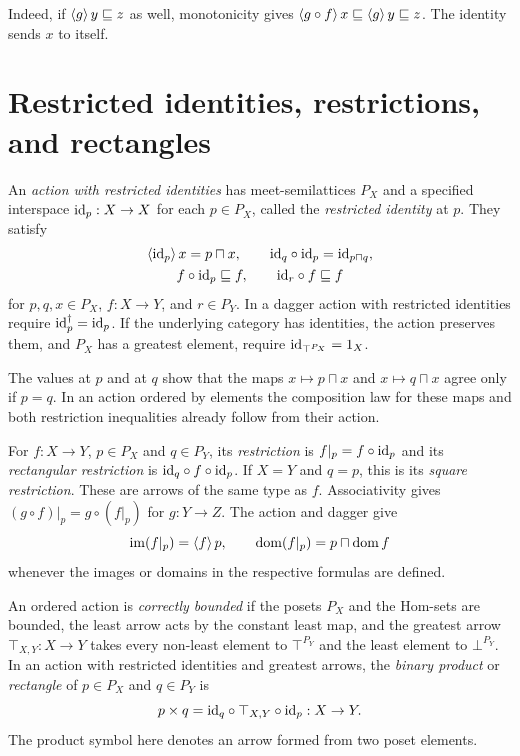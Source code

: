 Indeed, if $\left\langle g\right\rangle y\sqsubseteq z$ as well, monotonicity
gives $\left\langle g\circ f\right\rangle x\sqsubseteq\left\langle g\right\rangle y\sqsubseteq z$.
The identity sends $x$ to itself.

\section[Restrictions and rectangles]{Restricted identities, restrictions, and rectangles}
\label{sec-osa-restrictions}

\begin{defn}\label{def-osa-restriction}
An \emph{action with restricted identities} has meet-semilattices $P_X$
and a specified interspace ${\operatorname{id}}_p:X\to X$ for each $p\in P_X$,
called the \emph{restricted identity} at $p$. They satisfy
\[
\begin{gathered}
 \left\langle {\operatorname{id}}_p\right\rangle x=p\sqcap x,\qquad
 {\operatorname{id}}_q\circ{\operatorname{id}}_p={\operatorname{id}}_{p\sqcap q},\\
 f\circ{\operatorname{id}}_p\sqsubseteq f,\qquad {\operatorname{id}}_r\circ f\sqsubseteq f
\end{gathered}
\]
for $p,q,x\in P_X$, $f:X\to Y$, and $r\in P_Y$. In a dagger
action with restricted identities require ${\operatorname{id}}_p^\dagger={\operatorname{id}}_p$.
If the underlying category has identities, the action preserves them,
and $P_X$ has a greatest element, require ${\operatorname{id}}_{\top^{P_X}}=1_X$.
\end{defn}

The values at $p$ and at $q$ show that the maps
$x\mapsto p\sqcap x$ and $x\mapsto q\sqcap x$ agree only if $p=q$.
In an action ordered by elements the composition law for these maps
and both restriction inequalities already follow from their action.

For $f:X\to Y$, $p\in P_X$ and $q\in P_Y$, its \emph{restriction}
is $f|_p=f\circ{\operatorname{id}}_p$ and its \emph{rectangular restriction} is
${\operatorname{id}}_q\circ f\circ{\operatorname{id}}_p$. If $X=Y$ and $q=p$, this is its
\emph{square restriction}. These are arrows of the same type as $f$.
Associativity gives $(g\circ f)|_p=g\circ(f|_p)$ for $g:Y\to Z$.
The action and dagger give
\[
 \operatorname{im}(f|_p)=\left\langle f\right\rangle p,\qquad
 \operatorname{dom}(f|_p)=p\sqcap\operatorname{dom} f
\]
whenever the images or domains in the respective formulas are defined.

\begin{defn}\label{def-osa-rectangle}
An ordered action is \emph{correctly bounded} if the posets $P_X$ and
the Hom-sets are bounded, the least arrow acts by the constant least
map, and the greatest arrow $\top_{X,Y}:X\to Y$ takes every non-least
element to $\top^{P_Y}$ and the least element to $\bot^{P_Y}$.
In an action with restricted identities and greatest arrows, the
\emph{binary product} or \emph{rectangle} of $p\in P_X$ and
$q\in P_Y$ is
\[
 p\times q={\operatorname{id}}_q\circ\top_{X,Y}\circ{\operatorname{id}}_p:X\to Y .
\]
The product symbol here denotes an arrow formed from two poset
elements.
\end{defn}

